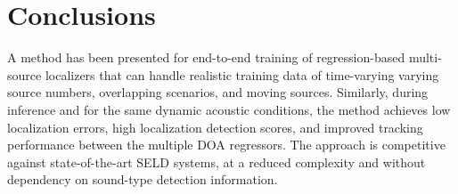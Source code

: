 \documentclass[conference]{IEEEtran}
\begin{document}
\section{Conclusions}
A method has been presented for end-to-end training of regression-based multi-source localizers that can handle realistic training data of time-varying varying source numbers, overlapping scenarios, and moving sources. Similarly, during inference and for the same dynamic acoustic conditions, the method achieves low localization errors, high localization detection  scores, and improved tracking performance between the multiple DOA regressors. The approach is competitive against state-of-the-art SELD systems, at a reduced complexity and without dependency on sound-type detection information. 



\end{document}
